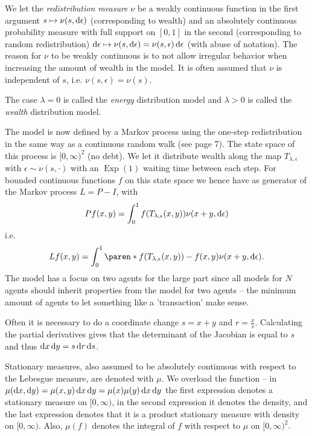 \documentclass{article}
\begin{document}
We let the \emph{redistribution measure} $\nu$ be a weakly continuous function in the first argument $s \mapsto \nu(s, \mathop{}\!\mathrm{d}\epsilon)$ (corresponding to wealth) and an absolutely continuous probability measure with full support on $[0, 1]$ in the second (corresponding to random redistribution) $\mathop{}\!\mathrm{d}\epsilon \mapsto \nu(s, \mathop{}\!\mathrm{d}\epsilon) = \nu(s, \epsilon) \mathop{}\!\mathrm{d} \epsilon$ (with abuse of notation). The reason for $\nu$ to be weakly continuous is to not allow irregular behavior when increasing the amount of wealth in the model. It is often assumed that $\nu$ is independent of $s$, i.e. $\nu(s, \epsilon) = \nu(s)$. %

The case $\lambda = 0$ is called the \emph{energy} distribution model and $\lambda > 0$ is called the \emph{wealth} distribution model.

The model is now defined by a Markov process using the one-step redistribution in the same way as a continuous random walk (see \cite{frankredig2014} page 7). The state space of this process is $[0, \infty)^2$ (no debt). We let it distribute wealth along the map $T_{\lambda, \epsilon}$ with $\epsilon \sim \nu(s, \cdot)$ with an $\operatorname*{Exp}(1)$ waiting time between each step. For bounded continuous functions $f$ on this state space we hence have as generator of the Markov process $L = P - I$, with
\[
Pf(x, y) = \int_0^1 f(T_{\lambda, \epsilon}(x, y)) \nu(x+y, \mathop{}\!\mathrm{d} \epsilon)
\]
i.e.
\[
L f(x, y) = \int_0^1 \paren*{f(T_{\lambda, \epsilon}(x, y)) - f(x, y) } \nu(x+y, \diff \epsilon).
\]
The model has a focus on two agents for the large part since all models for $N$ agents should inherit properties from the model for two agents -- the minimum amount of agents to let something like a 'transaction' make sense.

Often it is necessary to do a coordinate change $s = x+y$ and $r = \frac{x}{s}$. Calculating the partial derivatives gives that the determinant of the Jacobian is equal to $s$ and thus $\mathop{}\!\mathrm{d} x \mathop{}\!\mathrm{d} y = s \mathop{}\!\mathrm{d} r \mathop{}\!\mathrm{d} s$.

Stationary measures, also assumed to be absolutely continuous with respect to the Lebesgue measure, are denoted with $\mu$. We overload the function -- in $\mu(\mathop{}\!\mathrm{d} x, \mathop{}\!\mathrm{d} y) = \mu(x, y) \mathop{}\!\mathrm{d} x \mathop{}\!\mathrm{d} y = \mu(x) \mu(y) \mathop{}\!\mathrm{d} x \mathop{}\!\mathrm{d} y$ the first expression denotes a stationary measure on $[0, \infty)$, in the second expression it denotes the density, and the last expression denotes that it is a product stationary measure with density on $[0, \infty)$. Also, $\mu(f)$ denotes the integral of $f$ with respect to $\mu$ on $[0, \infty)^2$.
\end{document}
